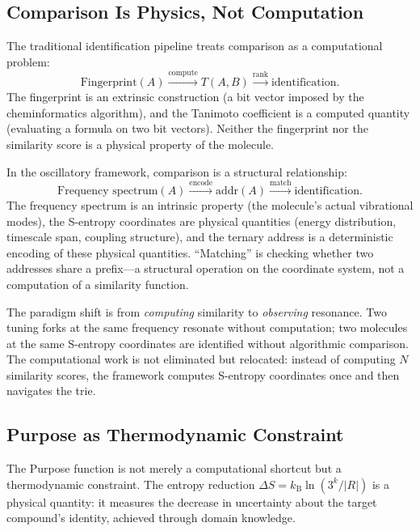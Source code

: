 \documentclass[11pt,twocolumn,a4paper]{article}
\theoremstyle{definition}
\theoremstyle{remark}
\newcommand{\kB}{k_{\mathrm{B}}}
\begin{document}
\subsection{Comparison Is Physics, Not Computation}\label{sec:physics-not-computation}

The traditional identification pipeline treats comparison as a computational problem:
\begin{equation}
  \text{Fingerprint}(A) \xrightarrow{\text{compute}} T(A, B) \xrightarrow{\text{rank}} \text{identification.}
\end{equation}
The fingerprint is an extrinsic construction (a bit vector imposed by the cheminformatics algorithm), and the Tanimoto coefficient is a computed quantity (evaluating a formula on two bit vectors). Neither the fingerprint nor the similarity score is a physical property of the molecule.

In the oscillatory framework, comparison is a structural relationship:
\begin{equation}
  \text{Frequency spectrum}(A) \xrightarrow{\text{encode}} \mathrm{addr}(A) \xrightarrow{\text{match}} \text{identification.}
\end{equation}
The frequency spectrum is an intrinsic property (the molecule's actual vibrational modes), the S-entropy coordinates are physical quantities (energy distribution, timescale span, coupling structure), and the ternary address is a deterministic encoding of these physical quantities. ``Matching'' is checking whether two addresses share a prefix---a structural operation on the coordinate system, not a computation of a similarity function.

The paradigm shift is from \emph{computing} similarity to \emph{observing} resonance. Two tuning forks at the same frequency resonate without computation; two molecules at the same S-entropy coordinates are identified without algorithmic comparison. The computational work is not eliminated but relocated: instead of computing $N$ similarity scores, the framework computes S-entropy coordinates once and then navigates the trie.

\subsection{Purpose as Thermodynamic Constraint}\label{sec:purpose-thermo}

The Purpose function is not merely a computational shortcut but a thermodynamic constraint. The entropy reduction $\Delta S = \kB \ln(3^k / |R|)$ is a physical quantity: it measures the decrease in uncertainty about the target compound's identity, achieved through domain knowledge.
\end{document}
